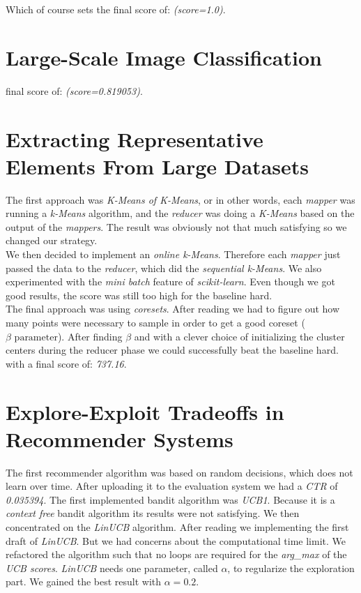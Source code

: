 \documentclass[a4paper, 11pt]{article}
\begin{document}
Which of course sets the final score of: \emph{(score=1.0)}.

\section{Large-Scale Image Classification}

final score of: \emph{(score=0.819053)}.


\section{Extracting Representative Elements From Large Datasets}
The first approach was \emph{K-Means of K-Means}, or in other words, each \emph{mapper} was running a \emph{k-Means} algorithm, and the \emph{reducer} was doing a \emph{K-Means} based on the output of the \emph{mappers}. The result was obviously not that much satisfying so we changed our strategy. \\

We then decided to implement an \emph{online k-Means}. Therefore each \emph{mapper} just passed the data to the \emph{reducer}, which did the \emph{sequential k-Means}. We also experimented with the \emph{mini batch} feature of \emph{scikit-learn}. Even though we got good results, the score was still too high for the baseline hard.\\

The final approach was using \emph{coresets}. After reading \cite{coreset} we had to figure out how many points were necessary to sample in order to get a good coreset ($\beta \text{ parameter}$). After finding $\beta$ and with a clever choice of initializing the cluster centers during the reducer phase we could successfully beat the baseline hard. with a final score of: \emph{737.16}.


\section{Explore-Exploit Tradeoffs in Recommender Systems}
The first recommender algorithm was based on random decisions, which does not learn over time. After uploading it to the evaluation system we had a \emph{CTR} of \emph{0.035394}. The first implemented bandit algorithm was \emph{UCB1}. Because it is a \emph{context free} bandit algorithm its results were not satisfying. 
We then concentrated on the \emph{LinUCB} algorithm. After reading \cite{LinUCB} we implementing the first draft of \emph{LinUCB}. But we had concerns about the computational time limit. We refactored the algorithm such that no loops are required for the \emph{arg\_max} of the \emph{UCB scores}. \emph{LinUCB} needs one parameter, called $\alpha$, to regularize the exploration part. We gained the best result with $\alpha=0.2$.\\
\end{document}

